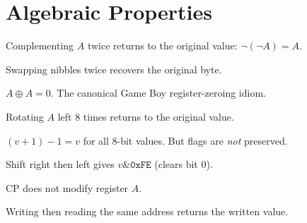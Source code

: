 \section{Algebraic Properties}

\begin{theorem}\label{thm:cpl_involution}
  \leanok
  Complementing $A$ twice returns to the original value: $\lnot(\lnot A) = A$.
\end{theorem}

\begin{theorem}\label{thm:swap_involution}
  \leanok
  Swapping nibbles twice recovers the original byte.
\end{theorem}

\begin{theorem}\label{thm:xor_self_zeros}
  \leanok
  $A \oplus A = 0$. The canonical Game Boy register-zeroing idiom.
\end{theorem}

\begin{theorem}\label{thm:rlca_period_8}
  \leanok
  Rotating $A$ left 8 times returns to the original value.
\end{theorem}

\begin{theorem}\label{thm:inc_dec_cancel}
  \leanok
  $(v + 1) - 1 = v$ for all 8-bit values. But flags are \emph{not} preserved.
\end{theorem}

\begin{theorem}\label{thm:srl_then_sla}
  \leanok
  Shift right then left gives $v \mathbin{\&} \mathtt{0xFE}$ (clears bit 0).
\end{theorem}

\begin{theorem}[CP Preserves A]\label{thm:cp_preserves_a}
  \leanok
  CP does not modify register $A$.
\end{theorem}

\begin{theorem}\label{thm:mem_write_read}
  \leanok
  Writing then reading the same address returns the written value.
\end{theorem}

